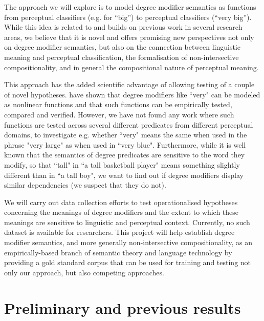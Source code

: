 \documentclass[11pt,a4paper]{article}
\newcommand{\instruction}[1]{}
\begin{document}
The approach we will explore is to model degree modifier semantics as functions from perceptual classifiers (e.g. for ``big”) to perceptual classifiers (``very big”). While this idea is related to and builds on previous work in several research areas, we believe that it is novel and offers promising new perspectives not only on degree modifier semantics, but also on the connection between linguistic meaning and perceptual classification, the formalisation of non-intersective compositionality, and in general the compositional nature of perceptual meaning. %


This approach has the added scientific advantage of allowing testing of a couple of novel hypotheses. \cite{hersh1976fuzzy}\/ have shown that degree modifiers like ``very" can be modeled as nonlinear functions and that such functions can be empirically tested, compared and verified. However, we have not found any work where such functions are tested across several different predicates from different perceptual domains, to investigate e.g. whether ``very" means the same when used in the phrase "very large" as when used in ``very blue". Furthermore, while it is well known that the semantics of degree predicates are sensitive to the word they modify, so that ``tall" in ``a tall basketball player" means something slightly different than in ``a tall boy", we want to find out if degree modifiers display similar dependencies (we suspect that they do not).

We will carry out data collection efforts to test operationalised hypotheses concerning the meanings of degree modifiers and the extent to which these meanings are sensitive to linguistic and perceptual context. Currently, no such dataset is available for researchers. This project will help establish degree modifier semantics, and more generally non-intersective compositionality, as an empirically-based branch of semantic theory and language technology by providing a gold standard corpus that can be used for training and testing not only our approach, but also competing approaches. %






\section{Preliminary and previous results}\instruction{Describe briefly your own previous research and pilot studies within the research area that make it probable that the project will be feasible. State also if no preliminary results exist. State whether the project contributes further to research and scientific results from a grant awarded previously by the Swedish Research Council.}
\end{document}
